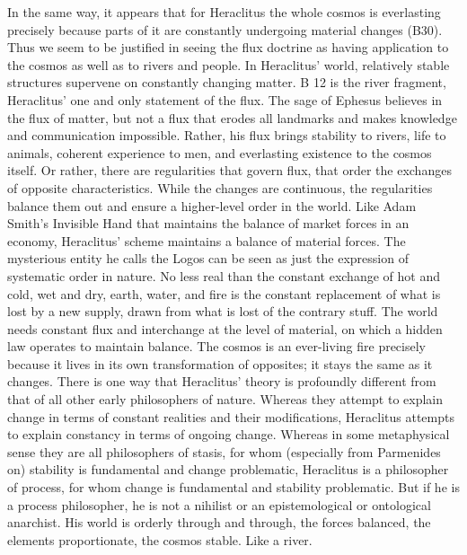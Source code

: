 \begin{compactdesc}
					\item[Dan Graham, ``Once More unto the Stream,'' 2013, 318--319] In the same way, it appears that for Heraclitus the whole cosmos is everlasting precisely because parts of it are constantly undergoing material changes (B30). Thus we seem to be justified in seeing the flux doctrine as having application to the cosmos as well as to rivers and people. In Heraclitus’ world, relatively stable structures supervene on constantly changing matter. B 12 is the river fragment, Heraclitus’ one and only statement of the flux. The sage of Ephesus believes in the flux of matter, but not a flux that erodes all landmarks and makes knowledge and communication impossible. Rather, his flux brings stability to rivers, life to animals, coherent experience to men, and everlasting existence to the cosmos itself. Or rather, there are regularities that govern flux, that order the exchanges of opposite characteristics. While the changes are continuous, the regularities balance them out and ensure a higher-level order in the world. Like Adam Smith’s Invisible Hand that maintains the balance of market forces in an economy, Heraclitus’ scheme maintains a balance of material forces. The mysterious entity he calls the Logos can be seen as just the expression of systematic order in nature. No less real than the constant exchange of hot and cold, wet and dry, earth, water, and fire is the constant replacement of what is lost by a new supply, drawn from what is lost of the contrary stuff. The world needs constant flux and interchange at the level of material, on which a hidden law operates to maintain balance. The cosmos is an ever-living fire precisely because it lives in its own transformation of opposites; it stays the same as it changes. There is one way that Heraclitus’ theory is profoundly different from that of all other early philosophers of nature. Whereas they attempt to explain change in terms of constant realities and their modifications, Heraclitus attempts to explain constancy in terms of ongoing change. Whereas in some metaphysical sense they are all philosophers of stasis, for whom (especially from Parmenides on) stability is fundamental and change problematic, Heraclitus is a philosopher of process, for whom change is fundamental and stability problematic. But if he is a process philosopher, he is not a nihilist or an epistemological or ontological anarchist. His world is orderly through and through, the forces balanced, the elements proportionate, the cosmos stable. Like a river.
				\end{compactdesc}
				

